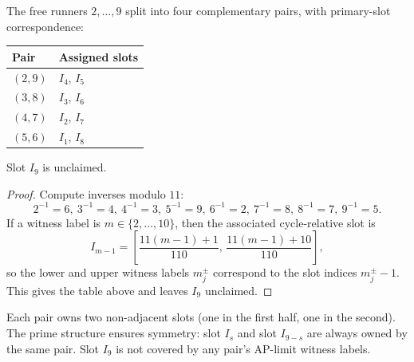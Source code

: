 \documentclass[12pt]{article}
\begin{document}
\begin{theorem}\label{t:42}
The free runners $2,\ldots,9$ split into four
complementary pairs, with primary-slot correspondence:

\begin{center}
\begin{tabular}{@{}ll@{}}
\toprule
Pair & Assigned slots \\
\midrule
$(2,9)$ & $I_4$, $I_5$ \\
$(3,8)$ & $I_3$, $I_6$ \\
$(4,7)$ & $I_2$, $I_7$ \\
$(5,6)$ & $I_1$, $I_8$ \\
\bottomrule
\end{tabular}
\end{center}

Slot $I_9$ is unclaimed.

\end{theorem}
\begin{proof}
Compute inverses modulo $11$:
\[
2^{-1}=6,\ 3^{-1}=4,\ 4^{-1}=3,\ 5^{-1}=9,\ 6^{-1}=2,\ 7^{-1}=8,\ 8^{-1}=7,\ 9^{-1}=5.
\]
If a witness label is $m\in\{2,\ldots,10\}$, then the associated cycle-relative slot is
\[
I_{m-1} = \left[\frac{11(m-1)+1}{110},\,\frac{11(m-1)+10}{110}\right],
\]
so the lower and upper witness labels $m_j^\pm$ correspond to the slot indices $m_j^\pm-1$.
This gives the table above and leaves $I_9$ unclaimed.
\end{proof}





Each pair owns two non-adjacent slots (one in the first half, one in the second). The
prime structure ensures symmetry: slot $I_s$ and slot $I_{9-s}$ are always owned by the
same pair. Slot $I_9$ is not covered by any pair's AP-limit witness labels.
\end{document}
